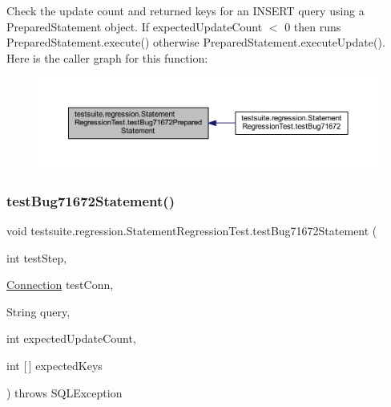 Check the update count and returned keys for an I\+N\+S\+E\+RT query using a Prepared\+Statement object. If expected\+Update\+Count $<$ 0 then runs Prepared\+Statement.\+execute() otherwise Prepared\+Statement.\+execute\+Update(). Here is the caller graph for this function\+:
\nopagebreak
\begin{figure}[H]
\begin{center}
\leavevmode
\includegraphics[width=350pt]{classtestsuite_1_1regression_1_1_statement_regression_test_ac89b52220f4a7d1e808940f72f5887c1_icgraph}
\end{center}
\end{figure}
\mbox{\label{classtestsuite_1_1regression_1_1_statement_regression_test_abb13639717a457989454d73d4dbc02b8}} 
\subsubsection{\texorpdfstring{test\+Bug71672\+Statement()}{testBug71672Statement()}}
{\footnotesize\ttfamily void testsuite.\+regression.\+Statement\+Regression\+Test.\+test\+Bug71672\+Statement (\begin{DoxyParamCaption}\item[{int}]{test\+Step,  }\item[{\mbox{\hyperlink{interfacecom_1_1mysql_1_1jdbc_1_1_connection}{Connection}}}]{test\+Conn,  }\item[{String}]{query,  }\item[{int}]{expected\+Update\+Count,  }\item[{int \mbox{[}$\,$\mbox{]}}]{expected\+Keys }\end{DoxyParamCaption}) throws S\+Q\+L\+Exception}

